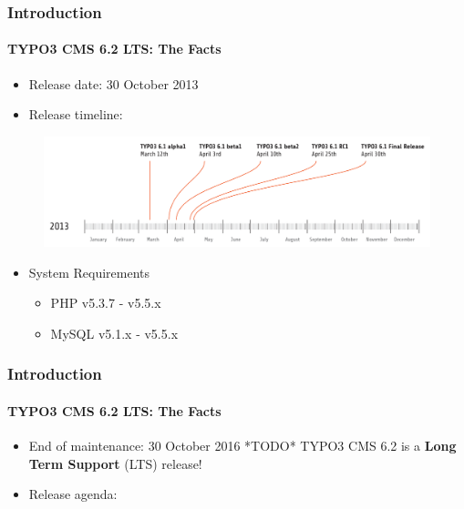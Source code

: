 
\begin{frame}[fragile]

	\frametitle{Introduction}
	\framesubtitle{TYPO3 CMS 6.2 LTS: The Facts}

	\begin{itemize}
		\item Release date: 30 October 2013
		\item Release timeline:
	\end{itemize}

	\begin{figure}
		\includegraphics[width=0.99\linewidth]{Images/Introduction/ReleaseTimeline.png}
	\end{figure}

	\begin{itemize}
		\item System Requirements
		\begin{itemize}
			\item PHP	\tabto{1.2cm} v5.3.7 - v5.5.x
			\item MySQL	\tabto{1.2cm} v5.1.x - v5.5.x
		\end{itemize}
	\end{itemize}

\end{frame}


\begin{frame}[fragile]
	\frametitle{Introduction}
	\framesubtitle{TYPO3 CMS 6.2 LTS: The Facts}

	\begin{itemize}
		\item End of maintenance: 30 October 2016 *TODO*\newline
			TYPO3 CMS 6.2 is a \textbf{Long Term Support} (LTS) release!
		\item Release agenda:
	\end{itemize}


\end{frame}

